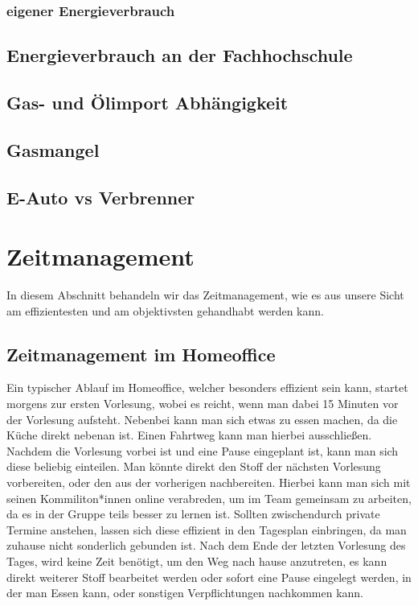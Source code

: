 \documentclass[a4paper,12pt]{scrartcl}
\begin{document}
\subsubsection{eigener Energieverbrauch}
\subsection{Energieverbrauch an der Fachhochschule}
\subsection{Gas- und Ölimport Abhängigkeit}
\subsection{Gasmangel}
\subsection{E-Auto vs Verbrenner}

\section{Zeitmanagement}
In diesem Abschnitt behandeln wir das Zeitmanagement, wie es aus unsere Sicht am effizientesten und am objektivsten gehandhabt werden kann.

\subsection{Zeitmanagement im Homeoffice}
Ein typischer Ablauf im Homeoffice, welcher besonders effizient sein kann, startet morgens zur ersten Vorlesung, wobei es reicht, wenn man dabei 15 Minuten vor der Vorlesung aufsteht. Nebenbei kann man sich etwas zu essen machen, da die Küche direkt nebenan ist. Einen Fahrtweg kann man hierbei ausschließen. Nachdem die Vorlesung vorbei ist und eine Pause eingeplant ist, kann man sich diese beliebig einteilen. Man könnte direkt den Stoff der nächsten Vorlesung vorbereiten, oder den aus der vorherigen nachbereiten. Hierbei kann man sich mit seinen Kommiliton*innen online verabreden, um im Team gemeinsam zu arbeiten, da es in der Gruppe teils besser zu lernen ist. Sollten zwischendurch private Termine anstehen, lassen sich diese effizient in den Tagesplan einbringen, da man zuhause nicht sonderlich gebunden ist. Nach dem Ende der letzten Vorlesung des Tages, wird keine Zeit benötigt, um den Weg nach hause anzutreten, es kann direkt weiterer Stoff bearbeitet werden oder sofort eine Pause eingelegt werden, in der man Essen kann, oder sonstigen Verpflichtungen nachkommen kann.
\end{document}
